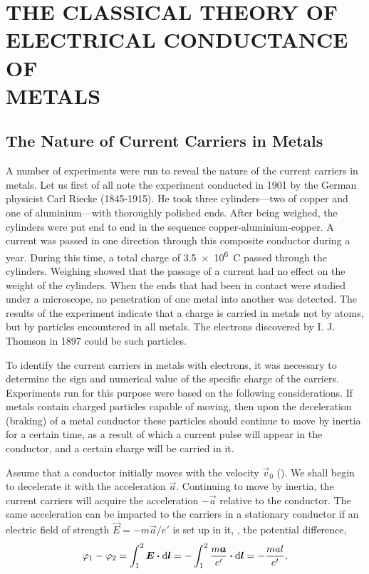 

\chapter[THE CLASSICAL THEORY OF ELECTRICAL CONDUCTANCE\\ OF METALS]{THE CLASSICAL THEORY
OF\\ ELECTRICAL CONDUCTANCE OF\\ METALS}\label{chap:11}

\section{The Nature of Current Carriers in Metals}\label{sec:11_1}

A number of experiments were run to reveal the nature of the current carriers in metals.
Let us first of all note the experiment conducted in 1901 by the German physicist Carl Riecke (1845-1915).
He took three cylinders---two of copper and one of aluminium---with thoroughly polished ends.
After being weighed, the cylinders were put end to end in the sequence copper-aluminium-copper.
A current was passed in one direction through this composite conductor during a year.
During this time, a total charge of \SI{3.5e6}{\coulomb} passed through the cylinders.
Weighing showed that the passage of a current had no effect on the weight of the cylinders.
When the ends that had been in contact were studied under a microscope, no penetration of one metal into
another was detected.
The results of the experiment indicate that a charge is carried in metals not by atoms, but by particles encountered in all metals.
The electrons discovered by I. J. Thomson in 1897 could be such particles.

To identify the current carriers in metals with electrons, it was necessary to determine the sign and numerical value of the specific charge of the carriers.
Experiments run for this purpose were based on the following considerations.
If metals contain charged particles capable of moving, then upon the deceleration (braking) of a metal conductor these particles should continue to move by inertia for a certain time, as a result of which a current pulse will appear in the conductor, and a certain charge will be carried in it.

Assume that a conductor initially moves with the velocity $\vec{v}_0$ ().
We shall begin to decelerate it with the acceleration $\vec{a}$.
Continuing to move by inertia, the current carriers will acquire the acceleration $-\vec{a}$ relative to the conductor.
The same acceleration can be imparted to the carriers in a stationary conductor if an electric field of strength $\vec{E}=-m\vec{a}/e'$ is set up in it, \ie, the potential difference,
\begin{equation*}
    \varphi_1 - \varphi_2 = \int_1^2 \boldsymbol{E} \boldsymbol{\cdot} \mathrm{d}\boldsymbol{l} = -\int_1^2 \frac{m \boldsymbol{a}}{e'} \boldsymbol{\cdot} \mathrm{d}\boldsymbol{l} = - \frac{mal}{e'},
\end{equation*}

